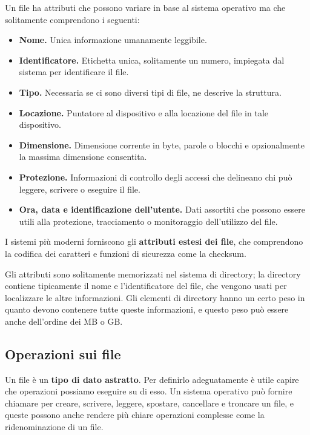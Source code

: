        Un file ha attributi che possono variare in base al sistema operativo ma che solitamente comprendono i seguenti:
        \begin{itemize}
            \item \textbf{Nome.} Unica informazione umanamente leggibile.
            
            \item \textbf{Identificatore.} Etichetta unica, solitamente un numero, impiegata dal sistema per identificare il file.
            
            \item \textbf{Tipo.} Necessaria se ci sono diversi tipi di file, ne descrive la struttura.
            
            \item \textbf{Locazione.} Puntatore al dispositivo e alla locazione del file in tale dispositivo.
            
            \item \textbf{Dimensione.} Dimensione corrente in byte, parole o blocchi e opzionalmente la massima dimensione consentita.
            
            \item \textbf{Protezione.} Informazioni di controllo degli accessi che delineano chi può leggere, scrivere o eseguire il file.
            
            \item \textbf{Ora, data e identificazione dell'utente.} Dati assortiti che possono essere utili alla protezione, tracciamento o monitoraggio dell'utilizzo del file.
        \end{itemize}
        
        I sistemi più moderni forniscono gli \textbf{attributi estesi dei file}, che comprendono la codifica dei caratteri e funzioni di sicurezza come la checksum.
        
        Gli attributi sono solitamente memorizzati nel sistema di directory; la directory contiene tipicamente il nome e l'identificatore del file, che vengono usati per localizzare le altre informazioni. Gli elementi di directory hanno un certo peso in quanto devono contenere tutte queste informazioni, e questo peso può essere anche dell'ordine dei MB o GB.
        
    \subsection{Operazioni sui file}
        Un file è un \textbf{tipo di dato astratto}. Per definirlo adeguatamente è utile capire che operazioni possiamo eseguire su di esso. Un sistema operativo può fornire chiamare per creare, scrivere, leggere, spostare, cancellare e troncare un file, e queste possono anche rendere più chiare operazioni complesse come la ridenominazione di un file.
        
